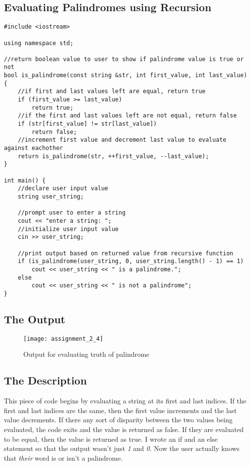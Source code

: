 \documentclass[11pt]{article}
\begin{document}
\subsection*{Evaluating Palindromes using Recursion}
\begin{lstlisting}
#include <iostream>

using namespace std;

//return boolean value to user to show if palindrome value is true or not
bool is_palindrome(const string &str, int first_value, int last_value) {
    //if first and last values left are equal, return true
    if (first_value >= last_value)
        return true;
    //if the first and last values left are not equal, return false
    if (str[first_value] != str[last_value])
        return false;
    //increment first value and decrement last value to evaluate against eachother
    return is_palindrome(str, ++first_value, --last_value);
}

int main() {
    //declare user input value
    string user_string;

    //prompt user to enter a string
    cout << "enter a string: ";
    //initialize user input value
    cin >> user_string;

    //print output based on returned value from recursive function
    if (is_palindrome(user_string, 0, user_string.length() - 1) == 1)
        cout << user_string << " is a palindrome.";
    else
        cout << user_string << " is not a palindrome";
}
\end{lstlisting}

\subsection*{The Output}
\begin{figure}[H]
    \centering
    \texttt{[image: assignment\_2\_4]}
    \caption{Output for evaluating truth of palindrome}
    \label{fig:part 4}
\end{figure}

\subsection*{The Description}
This piece of code begins by evaluating a string at its first and last indices. If the first and last indices are the same, then the first value increments and the last value decrements. If there any sort of disparity between the two values being evaluated, the code exits and the value is returned as false. If they are evaluated to be equal, then the value is returned as true. I wrote an if and an else statement so that the output wasn't just \textit{1} and \textit{0}. Now the user actually knows that \textit{their} word is or isn't a palindrome.
\end{document}
